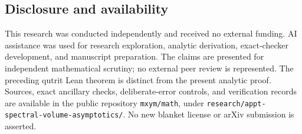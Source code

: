\documentclass[
  11pt,
]{article}
\begin{document}
\hypertarget{disclosure-and-availability}{%
\subsection{Disclosure and
availability}\label{disclosure-and-availability}}

This research was conducted independently and received no external
funding. AI assistance was used for research exploration, analytic
derivation, exact-checker development, and manuscript preparation. The
claims are presented for independent mathematical scrutiny; no external
peer review is represented. The preceding qutrit Lean theorem is
distinct from the present analytic proof. Sources, exact ancillary
checks, deliberate-error controls, and verification records are
available in the public repository \texttt{mxym/math}, under
\texttt{research/appt-spectral-volume-asymptotics/}. No new blanket
license or arXiv submission is asserted.
\end{document}
